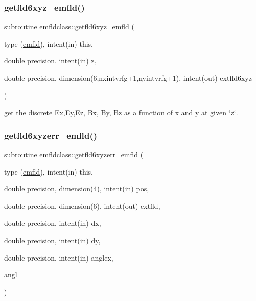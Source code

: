 \subsubsection{\texorpdfstring{getfld6xyz\_emfld()}{getfld6xyz\_emfld()}}
{\footnotesize\ttfamily subroutine emfldclass\+::getfld6xyz\+\_\+emfld (\begin{DoxyParamCaption}\item[{type (\mbox{\hyperlink{namespaceemfldclass_structemfldclass_1_1emfld}{emfld}}), intent(in)}]{this,  }\item[{double precision, intent(in)}]{z,  }\item[{double precision, dimension(6,nxintvrfg+1,nyintvrfg+1), intent(out)}]{extfld6xyz }\end{DoxyParamCaption})}



get the discrete Ex,Ey,Ez, Bx, By, Bz as a function of x and y at given \char`\"{}z\char`\"{}. 

\mbox{\label{namespaceemfldclass_a53a2dd6514711afd20442dab5686c5a4}} 
\subsubsection{\texorpdfstring{getfld6xyzerr\_emfld()}{getfld6xyzerr\_emfld()}}
{\footnotesize\ttfamily subroutine emfldclass\+::getfld6xyzerr\+\_\+emfld (\begin{DoxyParamCaption}\item[{type (\mbox{\hyperlink{namespaceemfldclass_structemfldclass_1_1emfld}{emfld}}), intent(in)}]{this,  }\item[{double precision, dimension(4), intent(in)}]{pos,  }\item[{double precision, dimension(6), intent(out)}]{extfld,  }\item[{double precision, intent(in)}]{dx,  }\item[{double precision, intent(in)}]{dy,  }\item[{double precision, intent(in)}]{anglex,  }\item[{}]{angl }\end{DoxyParamCaption})}

\mbox{\label{namespaceemfldclass_aa0023b4b2c7a17c75becc20eeb9be23c}} 
